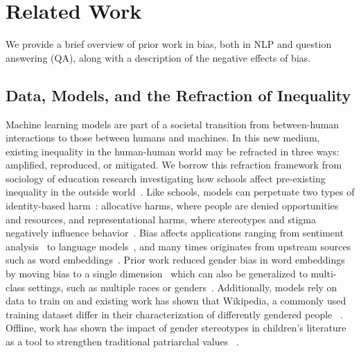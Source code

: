 \section{Related Work}
\label{sec:related}



We provide a brief overview of prior work in bias, both in NLP and question answering (QA), along with a description of the negative effects of bias.

\subsection{Data, Models, and the Refraction of Inequality}
\label{sec:refraction}
Machine learning models are part of a societal transition from between-human interactions to those between humans and machines.
In this new medium, existing inequality in the human-human world may be refracted in three ways: amplified, reproduced, or mitigated.
We borrow this refraction framework from sociology of education research investigating how schools affect pre-existing inequality in the outside world~\citep{downeyFiftyYearsColeman2016}.
Like schools, models can perpetuate two types of identity-based harm~\citep{sureshFrameworkUnderstandingSources2021}: allocative harms, where people are denied opportunities and resources, and representational harms, where stereotypes and stigma negatively influence behavior~\citep{barocasFairnessMachineLearning2019}.
Bias affects applications ranging from sentiment analysis~
\citep{thelwall2018gender} to language models~\citep{bordia2019identifying}, and many times originates from upstream sources such as word embeddings~\citep{garrido2021survey,manzini2019black}. 
Prior work reduced gender bias in word embeddings by moving bias to a single dimension~\citep{bolukbasi2016man} which can also be generalized to multi-class settings, such as multiple races or genders~\citep{manzini2019black}. 
Additionally, models rely on data to train on and existing work has shown that Wikipedia, a commonly used training dataset differ in their characterization of differently gendered people ~\cite{10.1145/2700171.2791036}.  Offline, work has shown the impact of gender stereotypes in children's literature as a tool to strengthen traditional patriarchal values ~\cite{karami2020gender}.  
